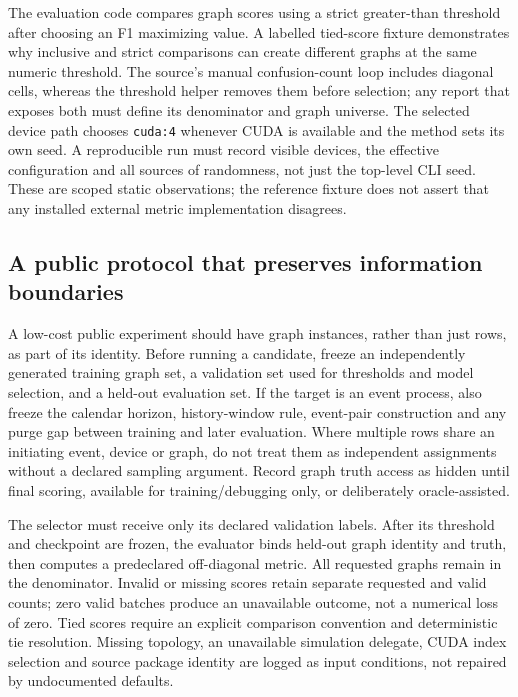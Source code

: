 The evaluation code compares graph scores using a strict greater-than threshold after choosing an
F1 maximizing value. A labelled tied-score fixture demonstrates why inclusive and strict
comparisons can create different graphs at the same numeric threshold. The source's manual
confusion-count loop includes diagonal cells, whereas the threshold helper removes them before
selection; any report that exposes both must define its denominator and graph universe. The
selected device path chooses \texttt{cuda:4} whenever CUDA is available and the method sets its own
seed. A reproducible run must record visible devices, the effective configuration and all sources
of randomness, not just the top-level CLI seed. These are scoped static observations; the reference
fixture does not assert that any installed external metric implementation disagrees.
\citep{exec28_at_tacd_protocol,exec28_at_protocol_reference}

\subsection{A public protocol that preserves information boundaries}
A low-cost public experiment should have graph instances, rather than just rows, as part of its
identity. Before running a candidate, freeze an independently generated training graph set,
a validation set used for thresholds and model selection, and a held-out evaluation set. If the
target is an event process, also freeze the calendar horizon, history-window rule, event-pair
construction and any purge gap between training and later evaluation. Where multiple rows share
an initiating event, device or graph, do not treat them as independent assignments without a
declared sampling argument. Record graph truth access as hidden until final scoring, available for
training/debugging only, or deliberately oracle-assisted.

The selector must receive only its declared validation labels. After its threshold and checkpoint
are frozen, the evaluator binds held-out graph identity and truth, then computes a predeclared
off-diagonal metric. All requested graphs remain in the denominator. Invalid or missing scores
retain separate requested and valid counts; zero valid batches produce an unavailable outcome,
not a numerical loss of zero. Tied scores require an explicit comparison convention and deterministic
tie resolution. Missing topology, an unavailable simulation delegate, CUDA index selection and
source package identity are logged as input conditions, not repaired by undocumented defaults.
\citep{exec28_at_protocol_reference,exec28_at_contract_fixture}


